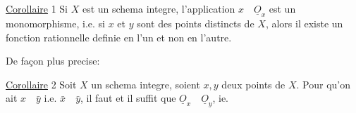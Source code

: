 \uline{Corollaire} 1 Si $X$ est un schema integre, l'application $x\quad\underline O_x$ est un monomorphisme, i.e. si $x$ et $y$ sont des points distincts de $X$, alors il existe un fonction rationnelle definie en l'un et non en l'autre.

De façon plus precise:

\uline{Corollaire} 2 Soit $X$ un schema integre, soient $x,y$ deux points de $X$. Pour qu'on ait $x\quad\bar y$ i.e. $\bar x\quad\bar y$, il faut et il suffit que $\underline O_x\quad\underline O_y$, ie.
